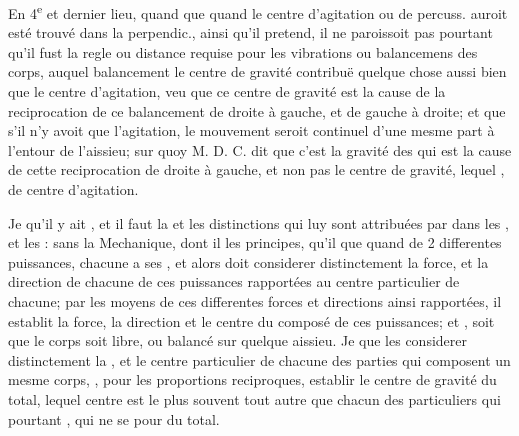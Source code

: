 \documentclass[11pt,a4paper]{article}
\begin{document}
En 4\textsuperscript{e} et dernier lieu, quand  que quand le centre d'agitation ou de percuss. auroit esté trouvé dans la perpendic., ainsi qu'il pretend, il ne paroissoit pas pourtant qu'il fust la regle ou distance requise pour les vibrations ou balancemens des corps, auquel balancement le centre de gravité contribuë quelque chose aussi bien que le centre d'agitation, veu que ce centre de gravité est la cause de la reciprocation de ce balancement de droite à gauche, et de gauche à droite; et que s'il n'y avoit que l'agitation, le mouvement seroit continuel d'une mesme part à l'entour de l'aissieu; sur quoy M. D. C. dit que c'est la gravité \ill{}  des \ill{} qui est la cause de cette reciprocation de droite à gauche, et non pas le centre de gravité, lequel \ill{} \ill{} \ill{}, \ill{} \ill{}  de centre d'agitation.


Je  qu'il y ait  \ill{}, et  \ill{} il faut la \ill{} et les distinctions qui luy sont attribuées par \ill{} \ill{} dans les \ill{}, et les \ill{}: sans  la Mechanique, dont il \ill{} \ill{} les principes, \ill{} \ill{} \ill{} qu'il \ill{} que quand \ill{} \ill{}  de 2 differentes puissances, chacune a ses \ill{} , et alors doit considerer distinctement la force, et la direction de chacune de ces puissances rapportées au centre particulier de chacune; par les moyens de ces differentes forces et directions ainsi rapportées, il establit la force, la direction et le centre du composé de ces puissances; et \ill{} \ill{}, soit que le corps soit libre, ou balancé sur quelque aissieu. Je  que les \ill{} considerer distinctement la , et le centre particulier de chacune des parties qui composent un mesme corps, \ill{}, pour les proportions reciproques, establir le centre de gravité du total, lequel centre est le plus souvent tout autre que chacun des particuliers qui pourtant \ill{} \ill{} \ill{}, qui ne se \ill{} pour \ill{} du total.
\end{document}

